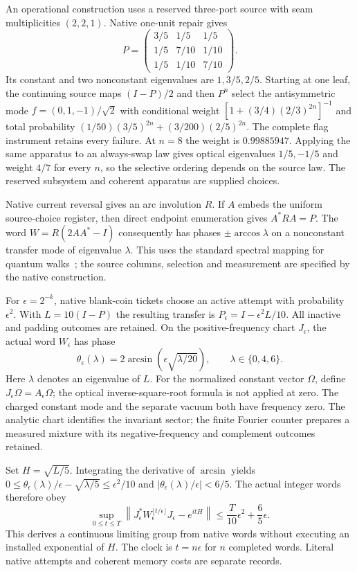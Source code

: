 An operational construction uses a reserved three-port source with seam
multiplicities $(2,2,1)$. Native one-unit repair gives
\[
 P=\begin{pmatrix}
 3/5&1/5&1/5\\
 1/5&7/10&1/10\\
 1/5&1/10&7/10
 \end{pmatrix}.
\]
Its constant and two nonconstant eigenvalues are $1,3/5,2/5$. Starting at
one leaf, the continuing source maps $(I-P)/2$ and then $P^n$ select the
antisymmetric mode $f=(0,1,-1)/\sqrt2$ with conditional weight
$[1+(3/4)(2/3)^{2n}]^{-1}$ and total probability
$(1/50)(3/5)^{2n}+(3/200)(2/5)^{2n}$. The complete flag instrument retains
every failure. At $n=8$ the weight is $0.99885947$. Applying the same
apparatus to an always-swap law gives optical eigenvalues $1/5,-1/5$ and
weight $4/7$ for every $n$, so the selective ordering depends on the source
law. The reserved subsystem and coherent apparatus are supplied choices.

Native current reversal gives an arc involution $R$. If $A$ embeds the
uniform source-choice register, then direct endpoint enumeration gives
$A^*RA=P$. The word $W=R(2AA^*-I)$ consequently has phases
$\pm\arccos\lambda$ on a nonconstant transfer mode of eigenvalue
$\lambda$. This uses the standard spectral mapping for quantum
walks~\cite{szegedy2004spectra,higuchi2016spectral}; the source columns,
selection and measurement are specified by the native construction.

For $\epsilon=2^{-k}$, native blank-coin tickets choose an active attempt
with probability $\epsilon^2$. With $L=10(I-P)$ the resulting transfer is
$P_\epsilon=I-\epsilon^2L/10$. All inactive and padding outcomes are retained.
On the positive-frequency chart $J_\epsilon$, the actual word
$W_\epsilon$ has phase
\[
 \theta_\epsilon(\lambda)
 =2\arcsin\!\left(\epsilon\sqrt{\lambda/20}\right),
 \qquad \lambda\in\{0,4,6\}.
\]
Here $\lambda$ denotes an eigenvalue of $L$. For the normalized constant
vector $\Omega$, define $J_\epsilon\Omega=A_\epsilon\Omega$; the optical
inverse-square-root formula is not applied at zero. The charged constant
mode and the separate vacuum both have frequency zero. The analytic chart identifies
the invariant sector; the finite Fourier counter prepares a measured mixture
with its negative-frequency and complement outcomes retained.

Set $H=\sqrt{L/5}$. Integrating the derivative of $\arcsin$ yields
$0\leq\theta_\epsilon(\lambda)/\epsilon-\sqrt{\lambda/5}
\leq\epsilon^2/10$ and $|\theta_\epsilon(\lambda)/\epsilon|<6/5$.
The actual integer words therefore obey
\[
 \sup_{0\leq t\leq T}
 \left\|J_\epsilon^*W_\epsilon^{\lfloor t/\epsilon\rfloor}J_\epsilon
       -e^{itH}\right\|
 \leq \frac{T}{10}\epsilon^2+\frac65\epsilon.
\]
This derives a continuous limiting group from native words without executing
an installed exponential of $H$. The clock is $t=n\epsilon$ for $n$ completed
words. Literal native attempts and coherent memory costs are separate records.

